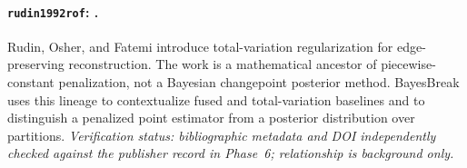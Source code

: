 \paragraph{\texttt{rudin1992rof}: \citet{rudin1992rof}.}
Rudin, Osher, and Fatemi introduce total-variation regularization for edge-preserving reconstruction. The work is a mathematical ancestor of piecewise-constant penalization, not a Bayesian changepoint posterior method. BayesBreak uses this lineage to contextualize fused and total-variation baselines and to distinguish a penalized point estimator from a posterior distribution over partitions. \textit{Verification status: bibliographic metadata and DOI independently checked against the publisher record in Phase~6; relationship is background only.}
